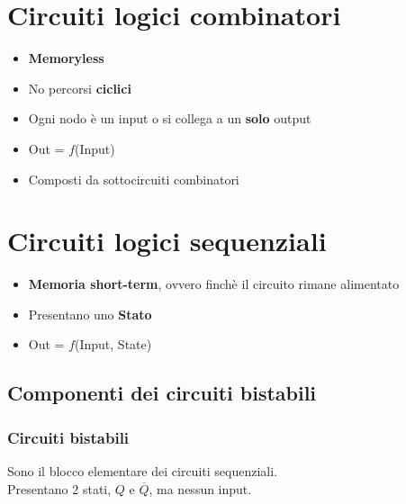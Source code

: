 \documentclass{report}
\newcommand{\n}[1]{\overline{#1}}
\begin{document}
\section{Circuiti logici combinatori}
    \begin{itemize}
        \item \textbf{Memoryless}
        \item No percorsi \textbf{ciclici}
        \item Ogni nodo è un input o si collega a un \textbf{solo} output
        \item Out = $f$(Input)
        \item Composti da sottocircuiti combinatori
    \end{itemize}
\section{Circuiti logici sequenziali}
    \begin{itemize}
        \item \textbf{Memoria short-term}, ovvero finchè il circuito rimane alimentato
        \item Presentano uno \textbf{Stato}
        \item Out = $f$(Input, State)
    \end{itemize}
    \subsection{Componenti dei circuiti bistabili}
        \subsubsection{Circuiti bistabili}
            Sono il blocco elementare dei circuiti sequenziali. \\
            Presentano 2 stati, $Q$ e $\n{Q}$, ma nessun input. \\
\end{document}
